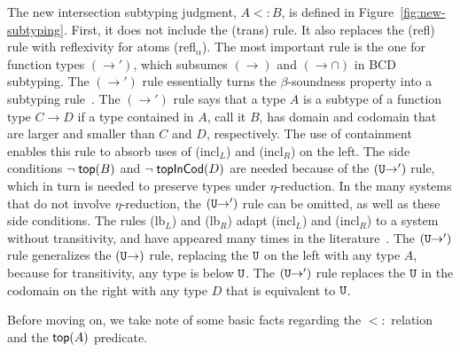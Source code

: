 \documentclass{article}
\begin{document}
The new intersection subtyping judgment, $A <: B$, is defined in
Figure~\ref{fig:new-subtyping}. First, it does not include the (trans)
rule.  It also replaces the (refl) rule with reflexivity for atoms
(refl$_\alpha$). The most important rule is the one for function types
$(\to')$, which subsumes $(\to)$ and $({\to}{\cap})$ in BCD subtyping.
The $(\to')$ rule essentially turns the $\beta$-soundness property
into a subtyping rule~\citep{Barendregt:2013aa}. The $(\to')$ rule
says that a type $A$ is a subtype of a function type $C \to D$ if a
type contained in $A$, call it $B$, has domain and codomain that are
larger and smaller than $C$ and $D$, respectively. The use of
containment enables this rule to absorb uses of (incl$_L$) and
(incl$_R$) on the left.  The side conditions $\neg\;\mathsf{top}(B)$ and
$\neg\;\mathsf{topInCod}(D)$ are needed because of the $(\mathtt{U}{\to}')$ rule,
which in turn is needed to preserve types under $\eta$-reduction.  In
the many systems that do not involve $\eta$-reduction, the
$(\mathtt{U}{\to}')$ rule can be omitted, as well as these side
conditions. The rules (lb$_L$) and (lb$_R$) adapt (incl$_L$) and
(incl$_R$) to a system without transitivity, and have appeared many
times in the literature~\citep{Bakel:1995aa}.  The $(\mathtt{U}{\to}')$ rule
generalizes the $(\mathtt{U}{\to})$ rule, replacing the $\mathtt{U}$ on the left
with any type $A$, because for transitivity, any type is below
$\mathtt{U}$. The $(\mathtt{U}{\to}')$ rule replaces the $\mathtt{U}$ in the
codomain on the right with any type $D$ that is equivalent to $\mathtt{U}$.

Before moving on, we take note of some basic facts regarding the $<:$
relation and the $\mathsf{top}(A)$ predicate.
\end{document}
